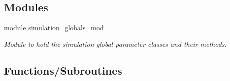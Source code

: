 \subsection*{Modules}
\begin{DoxyCompactItemize}
\item 
module \hyperlink{namespacesimulation__globals__mod}{simulation\+\_\+globals\+\_\+mod}
\begin{DoxyCompactList}\small\item\em Module to hold the simulation global parameter classes and their methods. \end{DoxyCompactList}\end{DoxyCompactItemize}
\subsection*{Functions/\+Subroutines}
